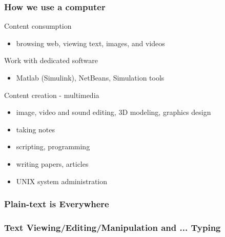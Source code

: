 \documentclass{beamer}
\begin{document}
\begin{frame}
  \frametitle{How we use a computer}

  \begin{block}{Content consumption}
    \begin{itemize}
      \item browsing web, viewing text, images, and videos
    \end{itemize} 
  \end{block}

  \begin{block}{Work with dedicated software}
    \begin{itemize}
      \item Matlab (Simulink), NetBeans, Simulation tools
    \end{itemize} 
  \end{block}

  \begin{block}{Content creation - multimedia}
    \begin{itemize}
      \item image, video and sound editing, 3D modeling, graphics design
    \end{itemize} 
  \end{block}

      \begin{itemize}
        \item taking notes
        \item scripting, programming
        \item writing papers, articles
        \item UNIX system administration
      \end{itemize} 

\end{frame}

\begin{frame}
  \frametitle{Plain-text is Everywhere}


\end{frame}

\begin{frame}
  \frametitle{Text Viewing/Editing/Manipulation and ... Typing}



\end{frame}
\end{document}

